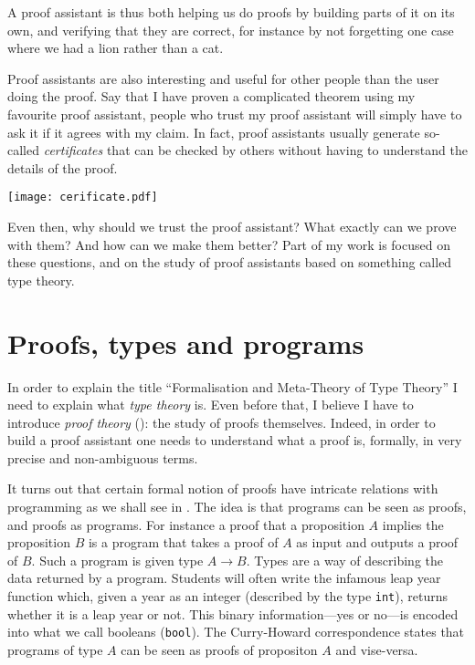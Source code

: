 A proof assistant is thus both helping us do proofs by building parts of it on
its own, and verifying that they are correct, for instance by not forgetting one
case where we had a lion rather than a cat.

Proof assistants are also interesting and useful for other people than the user
doing the proof. Say that I have proven a complicated theorem using my favourite
proof assistant, people who trust my proof assistant will simply have to ask it
if it agrees with my claim.
In fact, proof assistants usually generate so-called \emph{certificates} that
can be checked by others without having to understand the details of the proof.
\begin{center}
  \texttt{[image: cerificate.pdf]}
\end{center}

Even then, why should we trust the proof assistant? What exactly can we prove
with them? And how can we make them better?
Part of my work is focused on these questions, and on the study of proof
assistants based on something called type theory.

\section{Proofs, types and programs}

In order to explain the title ``Formalisation and Meta-Theory of Type Theory''
I need to explain what \emph{type theory} is. Even before that, I believe I have
to introduce \emph{proof theory} (): the study of proofs
themselves. Indeed, in order to build a proof assistant one needs to understand
what a proof is, formally, \ie in very precise and non-ambiguous terms.

It turns out that certain formal notion of proofs have intricate relations with
programming as we shall see in . The idea is that programs
can be seen as proofs, and proofs as programs.
For instance a proof that a proposition \(A\) implies the proposition \(B\)
is a program that takes a proof of \(A\) as input and outputs a proof of \(B\).
Such a program is given type \(A \to B\). Types are a way of describing the data
returned by a program. Students will often write the infamous leap year function
which, given a year as an integer (described by the type
\texttt{int}), returns whether it is a leap year or not. This binary
information---yes or no---is encoded into what we call booleans
(\texttt{bool}).
The Curry-Howard correspondence states that programs of type \(A\) can be seen
as proofs of propositon \(A\) and vise-versa.

